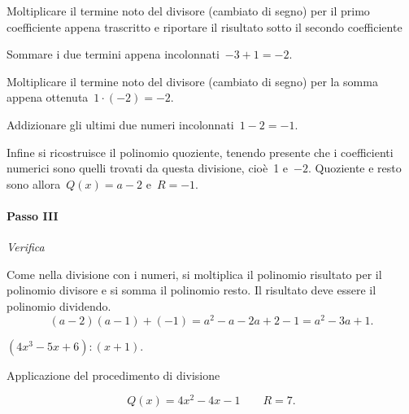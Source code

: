 \begin{exrig}
\begin{esempio}
\begin{multicols}{2}
 Moltiplicare il termine noto del divisore (cambiato di segno) per il
primo coefficiente appena trascritto e riportare il risultato sotto il
secondo coefficiente
\begin{center}

\end{center}
\end{multicols}

\begin{multicols}{2}
 Sommare i due termini appena incolonnati~$-3+1=-2$.
\begin{center}

\end{center}
\end{multicols}

\begin{multicols}{2}
 Moltiplicare il termine noto del divisore (cambiato di segno) per la
somma appena ottenuta~$1\cdot (-2)=-2$.
\begin{center}

\end{center}
\end{multicols}
\begin{multicols}{2}
 Addizionare gli ultimi due numeri incolonnati~$1-2=-1$.
\begin{center}

\end{center}
\end{multicols}

Infine si ricostruisce il polinomio quoziente, tenendo presente che i
coefficienti numerici sono quelli trovati da questa divisione, cioè~1
e~$-2$. Quoziente e resto sono allora~$Q(x)=a-2$ e~$R=-1$.

\paragraph{Passo III}\emph{Verifica}

Come nella divisione con i numeri, si moltiplica il polinomio risultato
per il polinomio divisore e si somma il polinomio resto. Il risultato
deve essere il polinomio dividendo.
\[(a - 2)(a - 1) + (-1) = a^{2} - a - 2a + 2 - 1 =a^{2}-3a + 1.\]
 \end{esempio}

\begin{esempio}
$(4x^{3} - 5x + 6): (x + 1).$

Applicazione del procedimento di divisione
\begin{center}

\end{center}
\[Q(x)=4x^{2}-4x-1 \qquad R=7.\]
\end{esempio}


\end{exrig}
